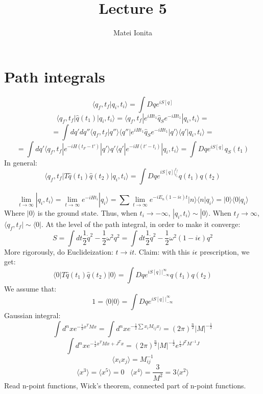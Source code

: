 \documentclass[12 pt]{article}
\title{Lecture 5}
\author{Matei Ionita}
\begin{document}
  \maketitle

\section*{Path integrals}
\[ \langle q_f, t_f | q_i, t_i\rangle = \int Dq e^{iS[q]}  \]
\[  \langle q_f, t_f | \hat q(t_1) | q_i, t_i\rangle = \langle q_f, t_f | e^{iHt_1} \hat q_S e^{-iHt_1} | q_i, t_i\rangle = \]
\[ = \int dq' dq'' \langle q_f, t_f |q''\rangle \langle q''| e^{iHt_1} \hat q_S e^{-iHt_1} |q' \rangle \langle q' | q_i, t_i\rangle  = \]
\[ = \int dq'   \langle q_f, t_f | e^{-iH(t_F - t')} |q'\rangle q' \langle q'| e^{-iH(t'-t_i)} | q_i, t_i\rangle = \int Dq e^{iS[q]} q_S (t_1)  \]
In general:
\[  \langle q_f, t_f | T \hat q(t_1) \hat q(t_2) |q_i, t_i\rangle = \int Dq e^{iS[q]|^{t_f}_{t_i}} q(t_1) q(t_2)  \]


\[  \lim_{t\to \infty} |q_i, t_i\rangle = \lim_{t\to \infty} e^{-iHt_i} |q_i\rangle = \sum \lim_{t\to\infty} e^{-iE_n (1- i\epsilon) t} |n\rangle \langle n| q_i\rangle = |0\rangle\langle 0 | q_i\rangle  \]
Where $|0\rangle$ is the ground state. Thus, when $t_i \to -\infty$, $|q_i, t_i\rangle \sim |0\rangle$. When $t_f \to \infty$, $\langle q_f, t_f| \sim \langle 0|$. At the level of the path integral, in order to make it converge:
\[  S = \int dt \frac{1}{2} \dot q^2 - \frac{1}{2} \omega^2 q^2 =  \int dt \frac{1}{2} \dot q^2 - \frac{1}{2} \omega^2 (1-i\epsilon) q^2  \]
More rigorously, do Euclideization: $t \to it$. Claim: with this $i\epsilon$ prescription, we get:
\[  \langle 0 | T \hat q(t_1) \hat q(t_2) |0\rangle = \int Dq e^{iS[q]|^{\infty}_{-\infty}} q(t_1) q(t_2)  \]
We assume that:
\[ 1=\langle 0 |0\rangle = \int Dq e^{iS[q]|^{\infty}_{-\infty}}  \]
Gaussian integral:
\[  \int d^n x e^{-\frac{1}{2} x^T M x} = \int d^n x e^{-\frac{1}{2} \sum x_i M_{ij} x_j} = (2\pi)^{\frac{n}{2}} |M|^{-\frac{1}{2}} \]
\[  \int d^n x e^{-\frac{1}{2} x^T M x + J^T x} = (2\pi)^{\frac{n}{2}} |M|^{-\frac{1}{2}} e^{\frac{1}{2} J^T M^{-1} J} \]
\[  \langle x_i x_j \rangle = M^{-1}_{ij}  \]
\[ \langle x^3 \rangle = \langle x^5 \rangle = 0 \;\;\; \langle x^4 \rangle = \frac{3}{M^2} = 3\langle x^2 \rangle     \]
Read n-point functions, Wick's theorem, connected part of n-point functions.
\end{document}
